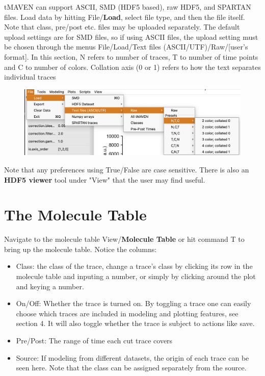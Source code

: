 \documentclass[11pt,a5paper,footinclude=true,headinclude=true]{scrbook} %
\begin{document}
        tMAVEN can support ASCII, SMD\cite{SMD} (HDF5 based), raw HDF5, and SPARTAN files. Load data by hitting File/\textbf{Load}, select file type, and then the file itself. Note that class, pre/post etc. files may be uploaded separately. The default upload settings are for SMD files, so if using ASCII files, the upload setting must be chosen through the menus File/Load/Text files (ASCII/UTF)/Raw/[user's format]. In this section, N refers to number of traces, T to number of time points and C to number of  colors. Collation axis (0 or 1) refers to how the text separates individual traces 
     
       \begin{figure} [h]
           \centering
           \includegraphics[scale=0.33]{ASCIIupload.png}
           
       \end{figure}
       
    
     
Note that any preferences using True/False are case sensitive. There is also an \textbf{HDF5 viewer} tool under "View" that the user may find useful.    

\section{The Molecule Table}    
        Navigate to the molecule table View/\textbf{Molecule Table} or hit command T to bring up the molecule table. Notice the columns:
    
   
         \begin{itemize}
         \item Class: the class of the trace, change a trace's class by clicking its row in the molecule table and inputing a number, or simply by clicking around the plot and keying a number.
         \item On/Off: Whether the trace is turned on. By toggling a trace one can easily choose which traces  are included in modeling and plotting features, see section 4. It will also toggle whether the trace is subject to actions like save.
         \item Pre/Post: The range of time each cut trace covers 
         \item Source: If modeling from different datasets, the origin of each trace can be seen here. Note that the class can be assigned separately from the source. 
         \end{itemize}
\end{document}
